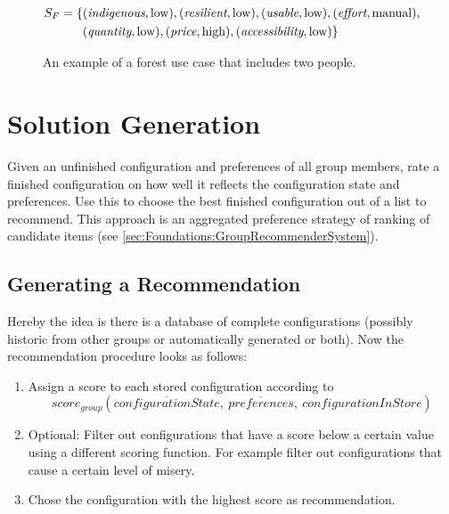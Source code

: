 \begin{figure}
\begin{mdframed}[frametitle={Example for Forest Use Case}, linecolor=black, frametitlerulecolor=black, frametitlebackgroundcolor=gray!5]
\begin{align}
            \begin{split}
            S_F  =  \{ & (\textit{indigenous}, \text{low}), (\textit{resilient}, \text{low}), (\textit{usable},\text{low}), (\textit{effort}, \text{manual}), \\
            & (\textit{quantity}, \text{low}), (\textit{price},\text{high}),(\textit{accessibility}, \text{low}) \} 
            \end{split} \notag
        \end{align}
    \end{mdframed}
    \caption{An example of a forest use case that includes two people.}
    \label{fig:Concept:ForestExample}
\end{figure}


\section{Solution Generation}
\label{sec:Concept:SolutionGeneration}

Given an unfinished configuration and preferences of all group members, rate a finished configuration on how well it reflects the configuration state and preferences. Use this to choose the best finished configuration out of a list to recommend. This approach is an aggregated preference strategy of ranking of candidate items (see \autoref{sec:Foundations:GroupRecommenderSystem}).

\subsection{Generating a Recommendation}

Hereby the idea is there is a database of complete configurations (possibly historic from other groups or automatically generated or both).
Now the recommendation procedure looks as follows:

\begin{enumerate}
    \item Assign a score to each stored configuration according to $$score_{group}(\overline{configurationState},\ \overline{preferences}, \ configurationInStore)$$
    \item Optional: Filter out configurations that have a score below a certain value using a different scoring function. For example filter out configurations that cause a certain level of misery.
    \item Chose the configuration with the highest score as recommendation.
\end{enumerate}

